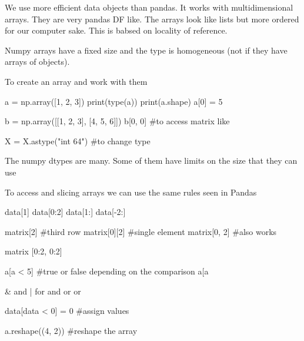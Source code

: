 We use more efficient data objects than pandas. It works with multidimensional arrays. They are very pandas DF like. 
The arrays look like lists but more ordered for our computer sake. This is babsed on locality of reference.

\vspace{10pt}

Numpy arrays have a fixed size and the type is homogeneous (not if they have arrays of objects).

\vspace{10pt}

To create an array and work with them

\begin{pythoncode}
    a = np.array([1, 2, 3])
    print(type(a))
    print(a.shape)
    a[0] = 5

    b = np.array([[1, 2, 3], [4, 5, 6]])
    b[0, 0] #to access matrix like

    X = X.astype("int 64") #to change type


\end{pythoncode}

\vspace{10pt}

The numpy dtypes are many. Some of them have limits on the size that they can use



\vspace{10pt}

To access and slicing arrays we can use the same rules seen in Pandas

\begin{pythoncode}
    data[1]
    data[0:2]
    data[1:]
    data[-2:]


    matrix[2] #third row
    matrix[0][2] #single element
    matrix[0, 2] #also works

    matrix [0:2, 0:2]

    a[a < 5] #true or false depending on the comparison
    a[a %

    & and | for and or or

    data[data < 0] = 0 #assign values

    a.reshape((4, 2)) #reshape the array
\end{pythoncode}



